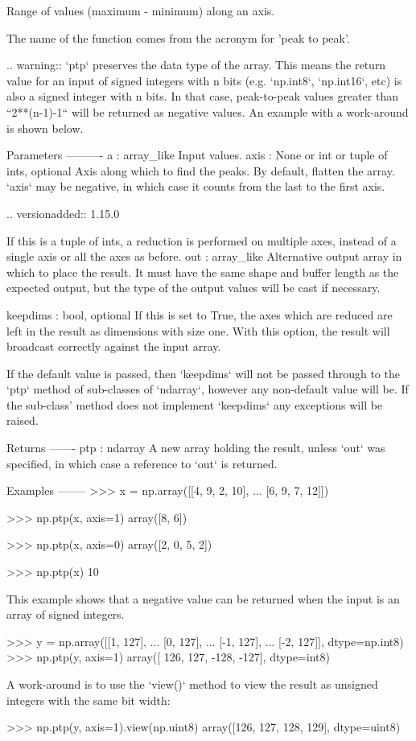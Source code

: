 \begin{DoxyVerb}Range of values (maximum - minimum) along an axis.

The name of the function comes from the acronym for 'peak to peak'.

.. warning::
    `ptp` preserves the data type of the array. This means the
    return value for an input of signed integers with n bits
    (e.g. `np.int8`, `np.int16`, etc) is also a signed integer
    with n bits.  In that case, peak-to-peak values greater than
    ``2**(n-1)-1`` will be returned as negative values. An example
    with a work-around is shown below.

Parameters
----------
a : array_like
    Input values.
axis : None or int or tuple of ints, optional
    Axis along which to find the peaks.  By default, flatten the
    array.  `axis` may be negative, in
    which case it counts from the last to the first axis.

    .. versionadded:: 1.15.0

    If this is a tuple of ints, a reduction is performed on multiple
    axes, instead of a single axis or all the axes as before.
out : array_like
    Alternative output array in which to place the result. It must
    have the same shape and buffer length as the expected output,
    but the type of the output values will be cast if necessary.

keepdims : bool, optional
    If this is set to True, the axes which are reduced are left
    in the result as dimensions with size one. With this option,
    the result will broadcast correctly against the input array.

    If the default value is passed, then `keepdims` will not be
    passed through to the `ptp` method of sub-classes of
    `ndarray`, however any non-default value will be.  If the
    sub-class' method does not implement `keepdims` any
    exceptions will be raised.

Returns
-------
ptp : ndarray
    A new array holding the result, unless `out` was
    specified, in which case a reference to `out` is returned.

Examples
--------
>>> x = np.array([[4, 9, 2, 10],
...               [6, 9, 7, 12]])

>>> np.ptp(x, axis=1)
array([8, 6])

>>> np.ptp(x, axis=0)
array([2, 0, 5, 2])

>>> np.ptp(x)
10

This example shows that a negative value can be returned when
the input is an array of signed integers.

>>> y = np.array([[1, 127],
...               [0, 127],
...               [-1, 127],
...               [-2, 127]], dtype=np.int8)
>>> np.ptp(y, axis=1)
array([ 126,  127, -128, -127], dtype=int8)

A work-around is to use the `view()` method to view the result as
unsigned integers with the same bit width:

>>> np.ptp(y, axis=1).view(np.uint8)
array([126, 127, 128, 129], dtype=uint8)\end{DoxyVerb}
